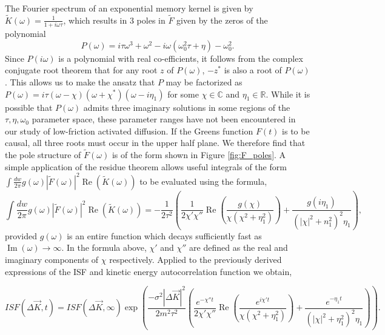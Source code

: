 \documentclass[7pt]{article}
\renewcommand*{\Re}{\operatorname{Re}}
\begin{document}
The Fourier spectrum of an exponential memory kernel is given by $\tilde{K}(\omega)=\frac{1}{1+i\omega\tau}$, which results in 3 poles in $\tilde{F}$ given by the zeros of the polynomial
\begin{equation}
	P(\omega) = i\tau\omega^3 + \omega^2 - i\omega(\omega_0^2\tau + \eta) - \omega_0^2.
\end{equation}
Since $P(i\omega)$ is a polynomial with real co-efficients, it follows from the complex conjugate root theorem that for any root $z$ of $P(\omega)$, $-z^*$ is also a root of $P(\omega)$. This allows us to make the ansatz that $P$ may be factorized as $P(\omega) = i\tau\left(\omega - \chi\right)\left(\omega + \chi^*\right)\left(\omega - i\eta_1\right)$ for some $\chi\in\mathbb{C}$ and ${\eta_1\in\mathbb{R}}$. While it is possible that $P(\omega)$ admits three imaginary solutions in some regions of the $\tau,\eta,\omega_0$ parameter space, these parameter ranges have not been encountered in our study of low-friction activated diffusion. If the Greens function $F(t)$ is to be causal, all three roots must occur in the upper half plane. We therefore find that the pole structure of $\tilde{F}(\omega)$ is of the form shown in Figure \ref{fig:F_poles}. A simple application of the residue theorem allows useful integrals of the form $\int\frac{dw}{2\pi} g\left(\omega\right) \left|\tilde{F}\left(\omega\right)\right|^2\Re(\tilde{K}(\omega))$ to be evaluated using the formula,
\begin{equation}
	\int\frac{dw}{2\pi} g\left(\omega\right) \left|\tilde{F}\left(\omega\right)\right|^2 \Re(\tilde{K}(\omega)) =  -\frac{1}{2 \tau^{2}}\left(\frac{1}{2 \chi' \chi''} \operatorname{Re}\left(\frac{g(\chi)}{\chi\left(\chi^{2}+\eta_{1}^{2}\right)}\right)+\frac{g(i\eta_{1})}{\left(|\chi|^{2}+n_{1}^{2}\right)^{2} \eta_{1}}\right), \label{eq:integral_over_CF}
\end{equation}
provided $g(\omega)$ is an entire function which decays sufficiently fast as $\operatorname{Im}({\omega})\rightarrow\infty$. In the formula above, $\chi'$ and $\chi''$ are defined as the real and imaginary components of $\chi$ respectively. Applied to the previously derived expressions of the ISF and kinetic energy autocorrelation function we obtain,

\begin{equation}
	ISF\left(\Delta \vec{K}, t\right) = ISF\left(\Delta \vec{K}, \infty\right) \exp\left(\frac{-\sigma^2\left|\Delta \vec{K}\right|^2}{2m^2\tau^2}\left(\frac{e^{-\chi''t}}{2\chi'\chi''}\operatorname{Re}\left(\frac{e^{i\chi't}}{\chi\left(\chi^2+\eta_1^2\right)}\right) + \frac{e^{-\eta_1t}}{\left(\left|\chi\right|^2+\eta_1^2\right)^2\eta_1}\right)\right) \label{eq:isf_exp}.
\end{equation}
\end{document}
